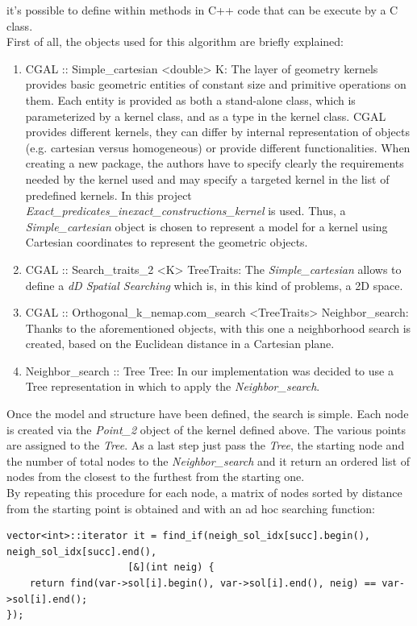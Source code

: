 it's possible to define within methods in C++ code that can be execute by a C class.\\
First of all, the objects used for this algorithm are briefly explained:
\begin{enumerate}
\item CGAL :: Simple\_cartesian <double> K: The layer of geometry kernels provides basic geometric entities of constant size and primitive operations on them. Each entity is provided as both a stand-alone class, which is parameterized by a kernel class, and as a type in the kernel class. CGAL provides different kernels, they can differ by internal representation of objects (e.g. cartesian versus homogeneous) or provide different functionalities. When creating a new package, the authors have to specify clearly the requirements needed by the kernel used and may specify a targeted kernel in the list of predefined kernels. In this project \textit{Exact\_predicates\_inexact\_constructions\_kernel} is used. Thus, a \textit{Simple\_cartesian} object is chosen to represent a model for a kernel using Cartesian coordinates to represent the geometric objects.
\item CGAL :: Search\_traits\_2 <K> TreeTraits: The \textit{Simple\_cartesian} allows to define a \textit{dD Spatial Searching} which is, in this kind of problems, a 2D space.
\item CGAL :: Orthogonal\_k\_nemap.com\_search <TreeTraits> Neighbor\_search: Thanks to the aforementioned objects, with this one a neighborhood search is created, based on the Euclidean distance in a Cartesian plane.
\item Neighbor\_search :: Tree Tree: In our implementation was decided to use a Tree representation in which to apply the \textit{Neighbor\_search}.
\end{enumerate}
Once the model and structure have been defined, the search is simple. Each node is created via the \textit{Point\_2} object of the kernel defined above. The various points are assigned to the \textit{Tree}. As a last step just pass the \textit{Tree}, the starting node and the number of total nodes to the \textit{Neighbor\_search} and it return an ordered list of nodes from the closest to the furthest from the starting one.\\
By repeating this procedure for each node, a matrix of nodes sorted by distance from the starting point is obtained and with an ad hoc searching function:

\begin{lstlisting}
vector<int>::iterator it = find_if(neigh_sol_idx[succ].begin(), neigh_sol_idx[succ].end(),
					 [&](int neig) {
	return find(var->sol[i].begin(), var->sol[i].end(), neig) == var->sol[i].end();
});
\end{lstlisting}

